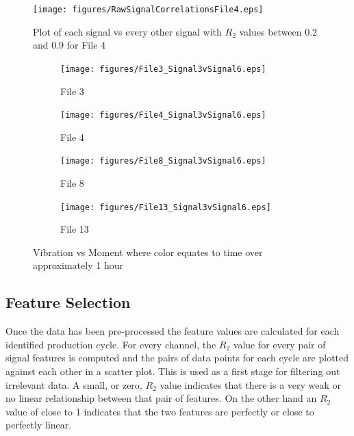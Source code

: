 \documentclass[]{article}
\begin{document}
\begin{center}
\begin{scriptsize}
 
\end{scriptsize}
\label{correlationTable}
\end{center}

\begin{figure}[H]
    \centering
    \texttt{[image: figures/RawSignalCorrelationsFile4.eps]}
    \caption{Plot of each signal vs every other signal with $R_2$ values between 0.2 and 0.9 for File 4}
    \label{fig:RawSignalCorrelationsFile1}
\end{figure}


\begin{figure}[H]
	\captionsetup[subfigure]{}
    \centering
		\begin{subfigure}{.45\textwidth}
		  	\centering
    			\texttt{[image: figures/File3\_Signal3vSignal6.eps]}
		  	\caption{File 3}
		  	\label{fig:File3_Signal3vSignal6}
		\end{subfigure}
		\hspace{\fill}
		\begin{subfigure}{.45\textwidth}
		  	\centering
 		   	\texttt{[image: figures/File4\_Signal3vSignal6.eps]}
		  	\caption{File 4}
		  	\label{fig:File4_Signal3vSignal6}
		\end{subfigure}  
	\bigskip    
    \centering
		\begin{subfigure}{.45\textwidth}
		  	\centering
    			\texttt{[image: figures/File8\_Signal3vSignal6.eps]}
		  	\caption{File 8}
		  	\label{fig:File8_Signal3vSignal6}
		\end{subfigure}
		\hspace{\fill}
		\begin{subfigure}{.45\textwidth}
		  	\centering
 		   	\texttt{[image: figures/File13\_Signal3vSignal6.eps]}
		  	\caption{File 13}
		  	\label{fig:File13_Signal3vSignal6}
		\end{subfigure}
    \caption{Vibration vs Moment where color equates to time over approximately 1 hour}
    \label{fig:RawSignalCorrelationsFile1_Caption}    
\end{figure}

\subsection{Feature Selection}
Once the data has been pre-processed the feature values are calculated for each identified production cycle. For every channel, the $R_2$ value for every pair of signal features is computed and the pairs of data points for each cycle are plotted against each other in a scatter plot. This is used as a first stage for filtering out irrelevant data. A small, or zero, $R_2$ value indicates that there is a very weak or no linear relationship between that pair of features. On the other hand an $R_2$ value of close to 1 indicates that the two features are perfectly or close to perfectly linear.
\end{document}
